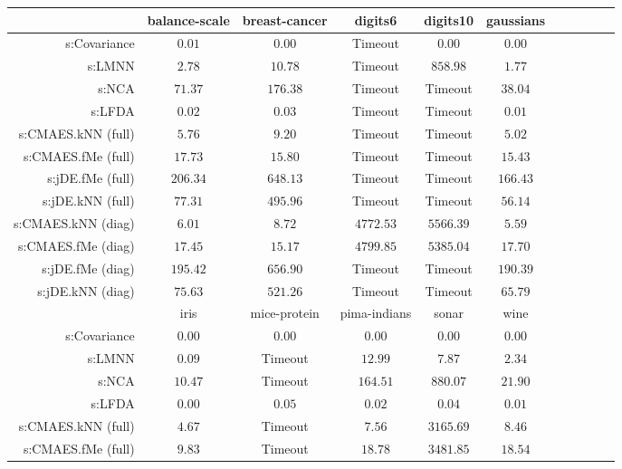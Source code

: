 \begin{table}[ht] \centering
{\small\renewcommand{\arraystretch}{1.0}
\setlength{\tabcolsep}{2pt}
\begin{tabular}{rcccccccccc}
\toprule


& \multicolumn{1}{c}{balance-scale} & \multicolumn{1}{c}{breast-cancer} & \multicolumn{1}{c}{digits6} & \multicolumn{1}{c}{digits10} & \multicolumn{1}{c}{gaussians} \\ 
\midrule
s:Covariance & $\bm{0.01}$ & $\bm{0.00}$ & Timeout  & $\bm{0.00}$ & $\bm{0.00}$ \\
s:LMNN & $2.78$ & $10.78$ & Timeout  & $858.98$ & $1.77$ \\
s:NCA & $71.37$ & $176.38$ & Timeout  & Timeout  & $38.04$ \\
s:LFDA & $0.02$ & $0.03$ & Timeout  & Timeout  & $0.01$ \\
s:CMAES.kNN (full) & $5.76$ & $9.20$ & Timeout  & Timeout  & $5.02$ \\
s:CMAES.fMe (full) & $17.73$ & $15.80$ & Timeout  & Timeout  & $15.43$ \\
s:jDE.fMe (full) & $206.34$ & $648.13$ & Timeout  & Timeout  & $166.43$ \\
s:jDE.kNN (full) & $77.31$ & $495.96$ & Timeout  & Timeout  & $56.14$ \\
s:CMAES.kNN (diag) & $6.01$ & $8.72$ & $\bm{4772.53}$ & $5566.39$ & $5.59$ \\
s:CMAES.fMe (diag) & $17.45$ & $15.17$ & $4799.85$ & $5385.04$ & $17.70$ \\
s:jDE.fMe (diag) & $195.42$ & $656.90$ & Timeout  & Timeout  & $190.39$ \\
s:jDE.kNN (diag) & $75.63$ & $521.26$ & Timeout  & Timeout  & $65.79$ \\
\midrule
& \multicolumn{1}{c}{iris} & \multicolumn{1}{c}{mice-protein} & \multicolumn{1}{c}{pima-indians} & \multicolumn{1}{c}{sonar} & \multicolumn{1}{c}{wine} \\ 
\midrule
s:Covariance & $\bm{0.00}$ & $\bm{0.00}$ & $\bm{0.00}$ & $\bm{0.00}$ & $\bm{0.00}$ \\
s:LMNN & $0.09$ & Timeout  & $12.99$ & $7.87$ & $2.34$ \\
s:NCA & $10.47$ & Timeout  & $164.51$ & $880.07$ & $21.90$ \\
s:LFDA & $\bm{0.00}$ & $0.05$ & $0.02$ & $0.04$ & $0.01$ \\
s:CMAES.kNN (full) & $4.67$ & Timeout  & $7.56$ & $3165.69$ & $8.46$ \\
s:CMAES.fMe (full) & $9.83$ & Timeout  & $18.78$ & $3481.85$ & $18.54$ \\

\end{tabular}}
\end{table}
